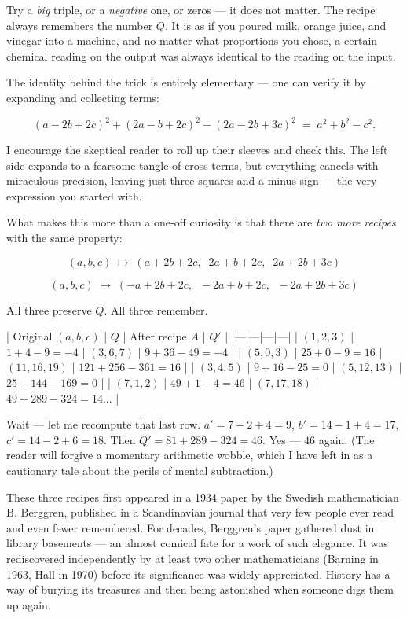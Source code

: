 \documentclass[11pt,twoside,openright]{book}
\theoremstyle{definition}
\theoremstyle{remark}
\begin{document}
Try a \textit{big} triple, or a \textit{negative} one, or zeros --- it does not matter. The recipe always remembers the number $Q$. It is as if you poured milk, orange juice, and vinegar into a machine, and no matter what proportions you chose, a certain chemical reading on the output was always identical to the reading on the input.


The identity behind the trick is entirely elementary --- one can verify it by expanding and collecting terms:

\[(a - 2b + 2c)^2 + (2a - b + 2c)^2 - (2a - 2b + 3c)^2 \;=\; a^2 + b^2 - c^2.\]

I encourage the skeptical reader to roll up their sleeves and check this. The left side expands to a fearsome tangle of cross-terms, but everything cancels with miraculous precision, leaving just three squares and a minus sign --- the very expression you started with.

What makes this more than a one-off curiosity is that there are \textit{two more recipes} with the same property:

\[(a, b, c) \;\longmapsto\; (a + 2b + 2c,\;\; 2a + b + 2c,\;\; 2a + 2b + 3c)\]

\[(a, b, c) \;\longmapsto\; (-a + 2b + 2c,\;\; -2a + b + 2c,\;\; -2a + 2b + 3c)\]

All three preserve $Q$. All three remember.

| Original $(a, b, c)$ | $Q$ | After recipe $A$ | $Q'$ |
|---|---|---|---|
| $(1, 2, 3)$ | $1 + 4 - 9 = -4$ | $(3, 6, 7)$ | $9 + 36 - 49 = -4$ |
| $(5, 0, 3)$ | $25 + 0 - 9 = 16$ | $(11, 16, 19)$ | $121 + 256 - 361 = 16$ |
| $(3, 4, 5)$ | $9 + 16 - 25 = 0$ | $(5, 12, 13)$ | $25 + 144 - 169 = 0$ |
| $(7, 1, 2)$ | $49 + 1 - 4 = 46$ | $(7, 17, 18)$ | $49 + 289 - 324 = 14$... |

Wait --- let me recompute that last row. $a' = 7 - 2 + 4 = 9$, $b' = 14 - 1 + 4 = 17$, $c' = 14 - 2 + 6 = 18$. Then $Q' = 81 + 289 - 324 = 46$. Yes --- $46$ again. (The reader will forgive a momentary arithmetic wobble, which I have left in as a cautionary tale about the perils of mental subtraction.)


These three recipes first appeared in a 1934 paper by the Swedish mathematician B. Berggren, published in a Scandinavian journal that very few people ever read and even fewer remembered. For decades, Berggren's paper gathered dust in library basements --- an almost comical fate for a work of such elegance. It was rediscovered independently by at least two other mathematicians (Barning in 1963, Hall in 1970) before its significance was widely appreciated. History has a way of burying its treasures and then being astonished when someone digs them up again.
\end{document}

